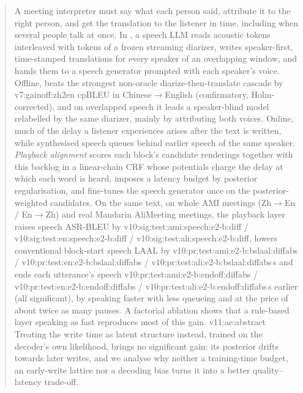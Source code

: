 \begin{abstract}
A meeting interpreter must say what each person said, attribute it to the right person, and get the translation to
the listener in time, including when several people talk at once. In \sys{}, a speech LLM reads acoustic tokens interleaved
with tokens of a frozen streaming diarizer, writes speaker-first, time-stamped translations for every speaker of an
overlapping window, and hands them to a speech generator prompted with each speaker's voice. Offline, \sys{} beats the
strongest non-oracle diarize-then-translate cascade by \num{v7:gainoff:zh2en} cpBLEU in Chinese$\rightarrow$English
(confirmatory, Holm-corrected), and on overlapped speech it leads a speaker-blind model relabelled by the same diarizer,
mainly by attributing both voices. Online, much of the delay a listener experiences arises after the text is written,
while synthesised speech queues behind earlier speech of the same speaker. \emph{Playback alignment} scores each
block's candidate renderings together with this backlog in a linear-chain CRF whose potentials charge the delay at
which each word is heard, imposes a latency budget by posterior regularisation, and fine-tunes the speech generator once on the posterior-weighted candidates. On the same
text, on whole AMI meetings (Zh$\rightarrow$En / En$\rightarrow$Zh) and real Mandarin AliMeeting meetings, the playback layer raises
speech ASR-BLEU by \num{v10:sig:test:ami:speech:e2-b:diff} / \num{v10:sig:test:en:speech:e2-b:diff} /
\num{v10:sig:test:ali:speech:e2-b:diff}, lowers conventional block-start speech LAAL by
\num{v10:pr:test:ami:e2-b:bslaal:diffabs} / \num{v10:pr:test:en:e2-b:bslaal:diffabs} /
\num{v10:pr:test:ali:e2-b:bslaal:diffabs}\,s and ends each utterance's speech \num{v10:pr:test:ami:e2-b:endoff:diffabs} /
\num{v10:pr:test:en:e2-b:endoff:diffabs} / \num{v10:pr:test:ali:e2-b:endoff:diffabs}\,s earlier (all significant), by speaking faster with less queueing and at the price of about twice as many
pauses.\ifFactorial{} A factorial ablation shows that a rule-based layer speaking as fast reproduces most of this
gain.\fi\ifAliEval{} \num{v11:ae:abstract}\fi{} Treating the write time as latent structure instead, trained on the decoder's own likelihood, brings no
significant gain: its posterior drifts towards later writes, and we analyse why neither a training-time budget, an
early-write lattice nor a decoding bias turns it into a better quality--latency trade-off.
\end{abstract}
